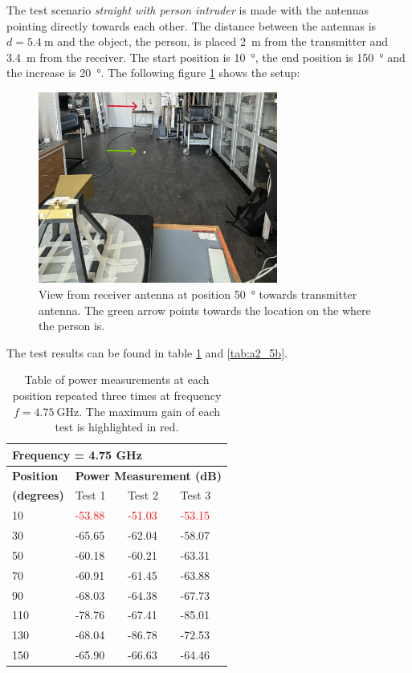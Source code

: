 The test scenario \textit{straight with person intruder} is made with the antennas pointing directly towards each other. The distance between the antennas is $d=\SI{5.4}{\meter}$ and the object, the person, is placed \SI{2}{\meter} from the transmitter and \SI{3.4}{\meter} from the receiver. The start position is \SI{10}{\degree}, the end position is \SI{150}{\degree} and the increase is \SI{20}{\degree}. The following figure \ref{fig:a2_5} shows the setup:
\begin{figure}[H]
    \centering
    \includegraphics[width=0.7\textwidth]{figures/test_intruder_person.JPG}
    \caption{View from receiver antenna at position \SI{50}{\degree} towards transmitter antenna. The green arrow points towards the location on the where the person is.} \label{fig:a2_5}
\end{figure}

The test results can be found in table \ref{tab:a2_5a} and \ref{tab:a2_5b}.
\begin{table}[H]
    \centering
    \begin{tabular}{l|l|l|l}
        \multicolumn{4}{l}{\textbf{Frequency = 4.75 GHz}}         \\
        \hline
        \textbf{Position} & \multicolumn{3}{l}{\textbf{Power Measurement (dB)}} \\
        \textbf{(degrees)}  & Test 1    & Test 2  & Test 3  \\
        \hline
        \hline
        10      & \textcolor{red}{-53.88}    & \textcolor{red}{-51.03}    & \textcolor{red}{-53.15} \\
        30      & -65.65    & -62.04    & -58.07 \\
        50      & -60.18    & -60.21    & -63.31 \\
        70      & -60.91    & -61.45    & -63.88 \\
        90      & -68.03    & -64.38    & -67.73 \\
        110     & -78.76    & -67.41    & -85.01 \\
        130     & -68.04    & -86.78    & -72.53 \\
        150     & -65.90    & -66.63    & -64.46
        \end{tabular}
    \caption{Table of power measurements at each position repeated three times at frequency $f=\SI{4.75}{\giga\hertz}$. The maximum gain of each test is highlighted in red.}
    \label{tab:a2_5a}
\end{table}

